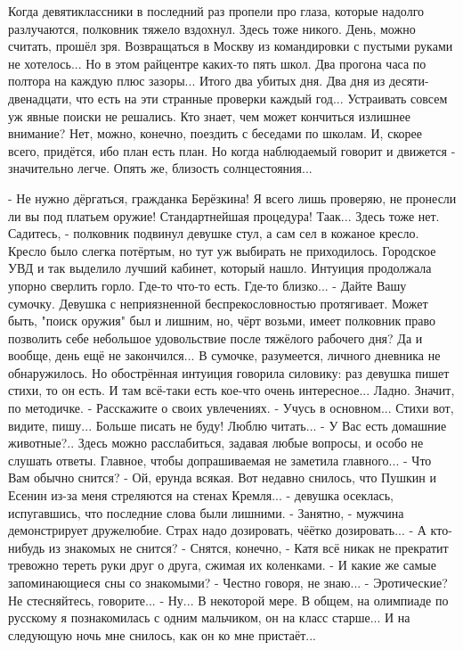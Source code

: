 Когда девятиклассники в последний раз пропели про глаза, которые надолго разлучаются, полковник тяжело вздохнул. Здесь тоже никого. День, можно считать, прошёл зря. Возвращаться в Москву из командировки с пустыми руками не хотелось... Но в этом райцентре каких-то пять школ. Два прогона часа по полтора на каждую плюс зазоры... Итого два убитых дня. Два дня из десяти-двенадцати, что есть на эти странные проверки каждый год... Устраивать совсем уж явные поиски не решались. Кто знает, чем может кончиться излишнее внимание?
Нет, можно, конечно, поездить с беседами по школам. И, скорее всего, придётся, ибо план есть план. Но когда наблюдаемый говорит и движется - значительно легче. Опять же, близость солнцестояния...


 - Не нужно дёргаться, гражданка Берёзкина! Я всего лишь проверяю, не пронесли ли вы под платьем оружие! Стандартнейшая процедура! Таак... Здесь тоже нет. Садитесь, - полковник подвинул девушке стул, а сам сел в кожаное кресло. Кресло было слегка потёртым, но тут уж выбирать не приходилось. Городское УВД и так выделило лучший кабинет, который нашло.
Интуиция продолжала упорно сверлить горло. Где-то что-то есть. Где-то близко...
 - Дайте Вашу сумочку.
Девушка с неприязненной беспрекословностью протягивает. Может быть, "поиск оружия" был и лишним, но, чёрт возьми, имеет полковник право позволить себе небольшое удовольствие после тяжёлого рабочего дня? Да и вообще, день ещё не закончился...
В сумочке, разумеется, личного дневника не обнаружилось. Но обострённая интуиция говорила силовику: раз девушка пишет стихи, то он есть. И там всё-таки есть кое-что очень интересное... Ладно. Значит, по методичке.
 - Расскажите о своих увлечениях.
 - Учусь в основном... Стихи вот, видите, пишу... Больше писать не буду! Люблю читать...
 - У Вас есть домашние животные?..
Здесь можно расслабиться, задавая любые вопросы, и особо не слушать ответы. Главное, чтобы допрашиваемая не заметила главного...
 - Что Вам обычно снится?
 - Ой, ерунда всякая. Вот недавно снилось, что Пушкин и Есенин из-за меня стреляются на стенах Кремля... - девушка осеклась, испугавшись, что последние слова были лишними.
 - Занятно, - мужчина демонстрирует дружелюбие. Страх надо дозировать, чёётко дозировать... - А кто-нибудь из знакомых не снится?
 - Снятся, конечно, - Катя всё никак не прекратит тревожно тереть руки друг о друга, сжимая их коленками.
 - И какие же самые запоминающиеся сны со знакомыми?
 - Честно говоря, не знаю...
 - Эротические? Не стесняйтесь, говорите...
 - Ну... В некоторой мере. В общем, на олимпиаде по русскому я познакомилась с одним мальчиком, он на класс старше... И на следующую ночь мне снилось, как он ко мне пристаёт...
